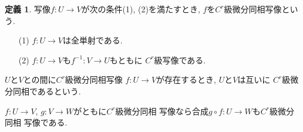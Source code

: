 \documentclass[a4j,12pt]{jarticle}
\theoremstyle{definition}
\newtheorem{definition}[theorem]{定義}
\begin{document}
\begin{definition}\label{def:C^r diffeomorphism}
    写像$f:U\to V$が次の条件(1), (2)を満たすとき, 
    $f$を$C^r$級微分同相写像という. 
    \begin{itemize}
        \item[(1)]
        $f:U\to V$は全単射である. 
        \item[(2)]
        $f:U\to V$も$f^{-1}:V\to U$もともに
        $C^r$級写像である. 
    \end{itemize}

    $U$と$V$との間に$C^r$級微分同相写像
$f:U\to V$が存在するとき, $U$と$V$は互いに
$C^r$級微分同相であるという.
\end{definition}
$f:U\to V$, $g:V\to W$がともに$C^r$級微分同相
写像なら合成$g\circ f:U\to W$も$C^r$級微分同相
写像である. 
 
\end{document}
